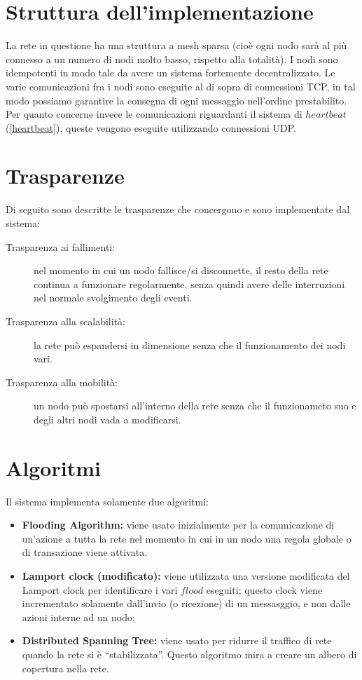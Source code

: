 \documentclass[italian]{memoir}
\begin{document}
\section{Struttura dell'implementazione}

La rete in questione ha una struttura a mesh sparsa (cioè ogni nodo sarà al più
	   connesso a un numero di nodi molto basso, rispetto alla totalità).
I nodi sono idempotenti in modo tale da avere un sistema fortemente decentralizzato.
Le varie comunicazioni fra i nodi sono eseguite al di sopra di connessioni TCP, in
	   tal modo possiamo garantire la consegna di ogni messaggio nell'ordine prestabilito.
Per quanto concerne invece le comunicazioni riguardanti il sistema di $heartbeat$
	   (\ref{heartbeat}), queste vengono eseguite utilizzando connessioni UDP.

\section{Trasparenze}\label{Trasparenze}

Di seguito sono descritte le trasparenze che concergono e sono implementate dal sistema:

\begin{description} 
\item[Trasparenza ai fallimenti:] nel momento in cui un nodo fallisce/si disconnette,
	   il resto della rete continua a funzionare regolarmente, senza quindi avere delle interruzioni nel normale svolgimento degli eventi.
\item[Trasparenza alla scalabilità:] la rete può espandersi in dimensione senza
	   che il funzionamento dei nodi vari.
\item[Trasparenza alla mobilità:] un nodo può spostarsi all'interno della rete
	   senza che il funzionameto suo e degli altri nodi vada a modificarsi.
\end{description}

\section{Algoritmi}

Il sistema implementa solamente due algoritmi:
\begin{itemize}
\item \textbf{Flooding Algorithm:} viene usato inizialmente per la comunicazione di un'azione
	   a tutta la rete nel momento in cui in un nodo una regola globale o di transazione viene attivata.
\item \textbf{Lamport clock (modificato):} viene utilizzata una versione modificata
	   del Lamport clock per identificare i vari $flood$ eseguiti; questo clock viene
	   incrementato
	   solamente dall'invio (o ricezione) di un messasggio, e non dalle azioni interne
	   ad un nodo;
\item \textbf{Distributed Spanning Tree:} viene usato per ridurre il traffico di rete 
       quando la rete si è ``stabilizzata''. Questo algoritmo mira a creare un albero di
       copertura nella rete.
\end{itemize}
\end{document}
